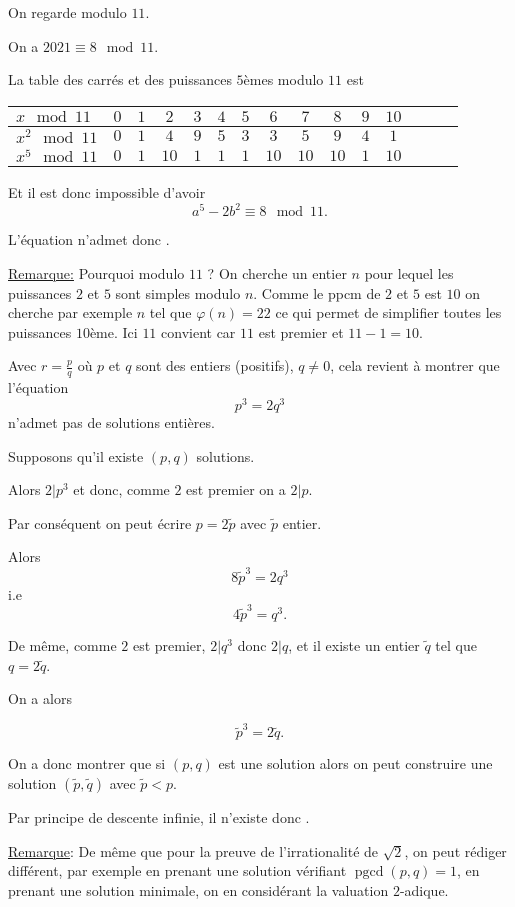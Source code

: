\begin{sol}
  On regarde modulo $11$.

  On a $2021 \equiv 8 \mod 11$.

  La table des carrés et des puissances $5$èmes modulo $11$ est

  \begin{center}
    \begin{tabular}{|l|c|c|c|c|c|c|c|c|c|c|c|c|c|c|}
      \hline
      $x \mod 11$   & $0$ & $1$ & $2$  & $3$ & $4$ & $5$ & $6$  & $7$  & $8$  & $9$ & $10$ \\
      \hline
      $x^2 \mod 11$ & $0$ & $1$ & $4$  & $9$ & $5$ & $3$ & $3$  & $5$  & $9$  & $4$ & $1$  \\
      $x^5 \mod 11$ & $0$ & $1$ & $10$ & $1$ & $1$ & $1$ & $10$ & $10$ & $10$ & $1$ & $10$ \\
      \hline
    \end{tabular}
  \end{center}

  Et il est donc impossible d'avoir
  \[a^{5} - 2 b^2 \equiv 8 \mod 11.\]


  L'équation n'admet donc .

  \underline{Remarque:} Pourquoi modulo $11$ ? On cherche un entier $n$ pour lequel les puissances $2$ et $5$ sont simples modulo $n$. Comme le ppcm de $2$ et $5$ est $10$ on cherche par exemple $n$ tel que $\varphi(n)=22$ ce qui permet de simplifier toutes les puissances $10$ème. Ici $11$ convient car $11$ est premier et $11-1 = 10$.
\end{sol}
\begin{sol}
  Avec $r = \frac{p}{q}$ où $p$ et $q$ sont des entiers (positifs), $q \neq 0$, cela revient à montrer que l'équation
  \[p^3 = 2 q^3\]
  n'admet pas de solutions entières.

  Supposons qu'il existe $(p,q)$ solutions.

  Alors $2 | p^3$ et donc, comme $2$ est premier on a $2 | p$.

  Par conséquent on peut écrire $p = 2 \tilde{p}$ avec $\tilde{p}$ entier.

  Alors
  \[8 \tilde{p}^3 = 2 q^3\]
  i.e
  \[4 \tilde{p}^3 =  q^3.\]

  De même, comme $2$ est premier, $2 | q^3$ donc $2 | q$, et il existe un entier $\tilde{q}$ tel que $q = 2 \tilde{q}$.

  On a alors

  \[\tilde{p}^3 = 2 \tilde{q}.\]


  On a donc montrer que si $(p,q)$ est une solution alors on peut construire une solution $(\tilde{p},\tilde{q})$ avec $\tilde{p} < p$.

  Par principe de descente infinie, il n'existe donc .

  \underline{Remarque}: De même que pour la preuve de l'irrationalité de $\sqrt{2}$, on peut rédiger différent, par exemple en prenant une solution vérifiant $\operatorname{pgcd}(p,q) = 1$, en prenant une solution minimale, on en considérant la valuation $2$-adique.
\end{sol}
